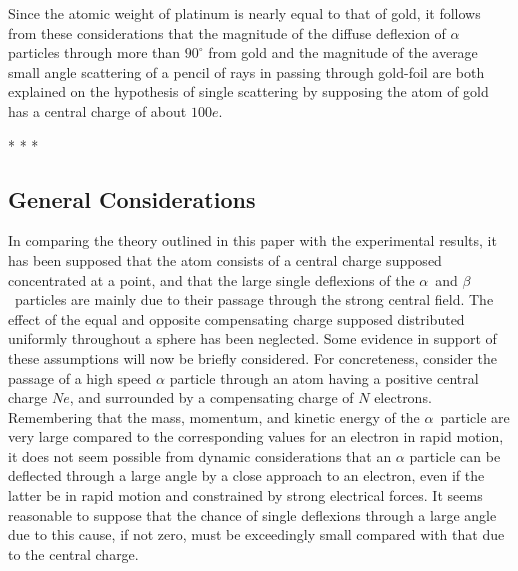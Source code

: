 Since the atomic weight of platinum is nearly equal to that of gold, it
follows from these considerations that the magnitude of the diffuse
deflexion of $\alpha$ particles through more than $90^\circ$ from gold and the
magnitude of the average small angle scattering of a pencil of rays in
passing through gold-foil are both explained on the hypothesis of single
scattering by supposing the atom of gold has a central charge of about
$100e$.\\
\centerline{* * *}
%
\subsection*{General Considerations}

In comparing the theory outlined in this paper with the experimental
results, it has been supposed that the atom consists of a central charge
supposed concentrated at a point, and that the large single deflexions
of the $\alpha$~and $\beta$~particles are mainly due to their passage
through the strong central field. The effect of the equal and opposite
compensating charge supposed distributed uniformly throughout a sphere
has been neglected. Some evidence in support of these assumptions will
now be briefly considered. For concreteness, consider the passage of a
high speed $\alpha$ particle through an atom having a positive central
charge $Ne$, and surrounded by a compensating charge of $N$
electrons. Remembering that the mass, momentum, and kinetic energy of
the $\alpha$~particle are very large compared to the corresponding
values for an electron in rapid motion, it does not seem possible from
dynamic considerations that an $\alpha$ particle can be deflected
through a large angle by a close approach to an electron, even if the
latter be in rapid motion and constrained by strong electrical forces.
It seems reasonable to suppose that the chance of single deflexions
through a large angle due to this cause, if not zero, must be
exceedingly small compared with that due to the central charge.

